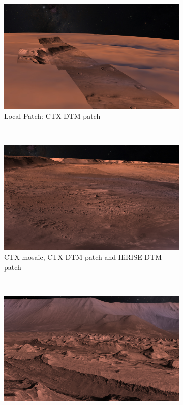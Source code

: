 \begin{figure}[h]
    \centering
    \begin{subfigure}[t]{0.45\textwidth}
        \includegraphics[width=\textwidth]{figures/results/screenshots_thesis_old/west_candor_chasma1.jpg}
        \caption{Local Patch: CTX DTM patch}
    \end{subfigure}
    ~
    \begin{subfigure}[t]{0.45\textwidth}
        \includegraphics[width=\textwidth]{figures/results/screenshots_thesis_old/west_candor_chasma2.jpg}
        \caption{CTX mosaic, CTX DTM patch and HiRISE DTM patch}
    \end{subfigure}
    ~
    \begin{subfigure}[t]{0.90\textwidth}
        \includegraphics[width=\textwidth]{figures/results/screenshots_thesis_old/west_candor_chasma3.jpg}

\end{subfigure}
\end{figure}
